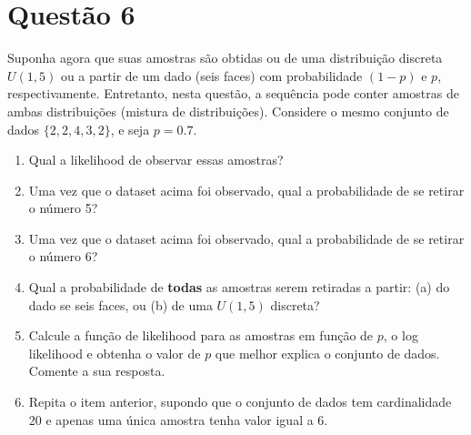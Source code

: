 \documentclass[12 pt]{article}
\begin{document}
\section*{Questão 6}
Suponha agora que suas amostras são obtidas ou de uma distribuição discreta $U(1, 5)$ ou a partir de um dado (seis faces) com probabilidade $(1 - p)$ e $p$, respectivamente. Entretanto, nesta questão, a sequência pode conter amostras de ambas distribuições (mistura de distribuições). Considere o mesmo conjunto de dados $\{2, 2, 4, 3, 2\}$, e seja $p = 0.7$.
\begin{enumerate}
    \item Qual a likelihood de observar essas amostras?
    \item Uma vez que o dataset acima foi observado, qual a probabilidade de se retirar o número 5?
    \item Uma vez que o dataset acima foi observado, qual a probabilidade de se retirar o número 6?
    \item Qual a probabilidade de \textbf{todas} as amostras serem retiradas a partir: (a) do dado se seis faces, ou (b) de uma $U(1, 5)$ discreta?
    \item Calcule a função de likelihood para as amostras em função de $p$, o log likelihood e obtenha o valor de $p$ que melhor explica o conjunto de dados. Comente a sua resposta.
    \item Repita o item anterior, supondo que o conjunto de dados tem cardinalidade 20 e apenas uma única amostra tenha valor igual a 6.
\end{enumerate}
\end{document}

